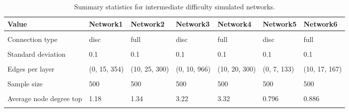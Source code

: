 \documentclass[
]{article}
\begin{document}
\clearpage
\newpage
\begin{table}
\centering\centering
\caption{\label{tab:unnamed-chunk-4}Summary statistics for intermediate difficulty simulated networks.}
\centering
\fontsize{10}{12}\selectfont
\fontsize{10}{12}\selectfont
\begin{tabular}[t]{>{\raggedright\arraybackslash}p{8em}llllll}
\toprule
Value & Network1 & Network2 & Network3 & Network4 & Network5 & Network6\\
\midrule
\cellcolor{gray!10}{Subgraph type} & \cellcolor{gray!10}{small world} & \cellcolor{gray!10}{small world} & \cellcolor{gray!10}{scale free} & \cellcolor{gray!10}{scale free} & \cellcolor{gray!10}{random graph} & \cellcolor{gray!10}{random graph}\\
Connection type & disc & full & disc & full & disc & full\\
\cellcolor{gray!10}{Layers} & \cellcolor{gray!10}{3} & \cellcolor{gray!10}{3} & \cellcolor{gray!10}{3} & \cellcolor{gray!10}{3} & \cellcolor{gray!10}{3} & \cellcolor{gray!10}{3}\\
Standard deviation & 0.1 & 0.1 & 0.1 & 0.1 & 0.1 & 0.1\\
\cellcolor{gray!10}{Nodes per layer} & \cellcolor{gray!10}{(5, 15, 300)} & \cellcolor{gray!10}{(5, 15, 300)} & \cellcolor{gray!10}{(5, 15, 300)} & \cellcolor{gray!10}{(5, 15, 300)} & \cellcolor{gray!10}{(5, 12, 167)} & \cellcolor{gray!10}{(5, 12, 167)}\\
\addlinespace
Edges per layer & (0, 15, 354) & (10, 25, 300) & (0, 10, 966) & (10, 20, 300) & (0, 7, 133) & (10, 17, 167)\\
\cellcolor{gray!10}{Subgraph probability} & \cellcolor{gray!10}{0.05} & \cellcolor{gray!10}{0.05} & \cellcolor{gray!10}{0.05} & \cellcolor{gray!10}{0.05} & \cellcolor{gray!10}{0.05} & \cellcolor{gray!10}{0.05}\\
Sample size & 500 & 500 & 500 & 500 & 500 & 500\\
\cellcolor{gray!10}{Modularity (top)} & \cellcolor{gray!10}{0.799} & \cellcolor{gray!10}{0.715} & \cellcolor{gray!10}{0.78} & \cellcolor{gray!10}{0.751} & \cellcolor{gray!10}{0.791} & \cellcolor{gray!10}{0.665}\\
Average node degree top & 1.18 & 1.34 & 3.22 & 3.32 & 0.796 & 0.886\\
\addlinespace
\cellcolor{gray!10}{Avg connections within top communities} & \cellcolor{gray!10}{70.8} & \cellcolor{gray!10}{73.6} & \cellcolor{gray!10}{193.2} & \cellcolor{gray!10}{193.2} & \cellcolor{gray!10}{26.6} & \cellcolor{gray!10}{26}\\

\end{tabular}
\end{table}
\end{document}
